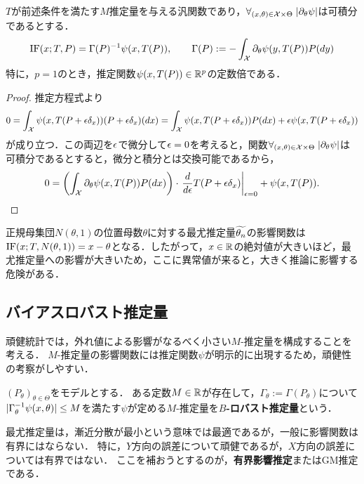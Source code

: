 \documentclass[uplatex,dvipdfmx]{jsreport}
\begin{document}
\begin{lemma}[$M$-推定量の影響関数]
    $T$が前述条件を満たす$M$推定量を与える汎関数であり，$\forall_{(x,\theta)\in\mathcal{X}\times\Theta}\;\lvert\partial_\theta\psi\rvert$は可積分であるとする．
    \[\mathrm{IF}(x;T,P)=\Gamma(P)^{-1}\psi(x,T(P)),\qquad\Gamma(P):=-\int_{\mathcal{X}}\partial_\theta\psi(y,T(P))P(dy)\]
    特に，$p=1$のとき，推定関数$\psi(x,T(P))\in\mathbb{R}^p$の定数倍である．
\end{lemma}
\begin{proof}
    推定方程式より
    \[0=\int_{\mathcal{X}}\psi(x,T(P+\epsilon\delta_x))(P+\epsilon\delta_x)(dx)=\int_{\mathcal{X}}\psi(x,T(P+\epsilon\delta_x))P(dx)+\epsilon\psi(x,T(P+\epsilon\delta_x))\]
    が成り立つ．この両辺を$\epsilon$で微分して$\epsilon=0$を考えると，関数$\forall_{(x,\theta)\in\mathcal{X}\times\Theta}\;\lvert\partial_\theta\psi\rvert$は可積分であるとすると，微分と積分とは交換可能であるから，
    \[0=\left(\int_{\mathcal{X}}\partial_\theta\psi(x,T(P))P(dx)\right)\cdot\left.\frac{d }{d \epsilon}T(P+\epsilon\delta_x)\right|_{\epsilon=0}+\psi(x,T(P)).\]
\end{proof}

\begin{example}
    正規母集団$N(\theta,1)$の位置母数$\theta$に対する最尤推定量$\widetilde{\theta_n}$の影響関数は$\mathrm{IF}(x;T,N(\theta,1))=x-\theta$となる．したがって，$x\in\mathbb{R}$の絶対値が大きいほど，最尤推定量への影響が大きいため，ここに異常値が来ると，大きく推論に影響する危険がある．
\end{example}

\subsection{バイアスロバスト推定量}

\begin{tcolorbox}[colframe=ForestGreen, colback=ForestGreen!10!white,breakable,colbacktitle=ForestGreen!40!white,coltitle=black,fonttitle=\bfseries\sffamily,
title=]
    頑健統計では，外れ値による影響がなるべく小さい$M$-推定量を構成することを考える．
    $M$-推定量の影響関数には推定関数$\psi$が明示的に出現するため，頑健性の考察がしやすい．
\end{tcolorbox}

\begin{definition}
    $(P_\theta)_{\theta\in\Theta}$をモデルとする．
    ある定数$M\in\mathbb{R}$が存在して，$\Gamma_\theta:=\Gamma(P_\theta)$について$\lvert\Gamma^{-1}_\theta\psi(x,\theta)\rvert\le M$を満たす$\psi$が定める$M$-推定量を\textbf{$B$-ロバスト推定量}という．
\end{definition}

\begin{example}[最尤推定]
    最尤推定量は，漸近分散が最小という意味では最適であるが，一般に影響関数は有界にはならない．
    特に，$Y$方向の誤差について頑健であるが，$X$方向の誤差については有界ではない．
    ここを補おうとするのが，\textbf{有界影響推定}またはGM推定である．
\end{example}
\end{document}
